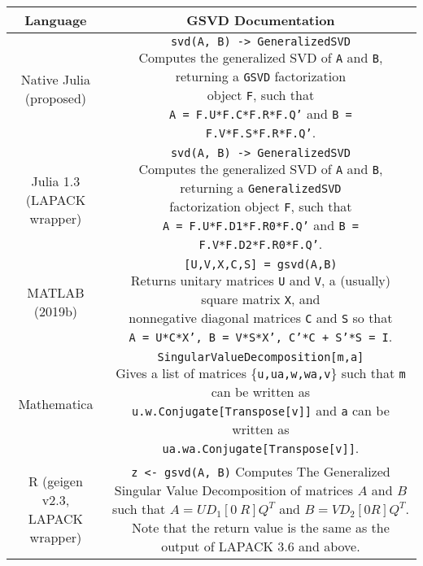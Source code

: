     \begin{table}[H]
        \centering
        \begin{tabular}{|c|c|}
            \hline
            Language & GSVD Documentation \\ \hline\hline
            Native Julia (proposed) &  \makecell[l]{\texttt{svd(A, B) -> GeneralizedSVD} \\ Computes the generalized SVD of \texttt{A} and \texttt{B},  returning a \texttt{GSVD} factorization\\ object \texttt{F}, such that \\ \texttt{A = F.U*F.C*F.R*F.Q'} and \texttt{B = F.V*F.S*F.R*F.Q'}.}\\ \hline
            Julia 1.3 (LAPACK wrapper) &  \makecell[l]{\texttt{svd(A, B) -> GeneralizedSVD} \\ Computes the generalized SVD of \texttt{A} and \texttt{B},  returning a \texttt{GeneralizedSVD}\\ factorization object \texttt{F}, such that \\ \texttt{A = F.U*F.D1*F.R0*F.Q'} and \texttt{B = F.V*F.D2*F.R0*F.Q'}.}\\ \hline
            MATLAB (2019b) & \makecell[l]{\texttt{[U,V,X,C,S] = gsvd(A,B)} \\
            Returns unitary matrices \texttt{U} and \texttt{V}, a (usually) square matrix \texttt{X}, and \\ nonnegative diagonal matrices \texttt{C} and \texttt{S} so that \\
                \texttt{A = U*C*X', B = V*S*X', C'*C + S'*S = I}.}\\ \hline
            Mathematica & \makecell[l]{\texttt{SingularValueDecomposition[{m,a}]} \\
            Gives a list of matrices \{\texttt{{u,ua},{w,wa},v}\} such that \texttt{m} can be written as \\ \texttt{u.w.Conjugate[Transpose[v]]} and \texttt{a} can be written as \\ \texttt{ua.wa.Conjugate[Transpose[v]]}. } \\ \hline
            R (geigen v2.3, LAPACK wrapper) & \makecell[l]{\texttt{z <- gsvd(A, B)}\\
            Computes The Generalized Singular Value Decomposition of matrices \\ $A$ and $B$ such that $A = UD_{1}[0 \ R]Q^{T}$ and $B = VD_{2}[0 R]Q^{T}$. Note that \\ the return value is the same as the output of LAPACK 3.6 and above. }

\end{tabular}
\end{table}

